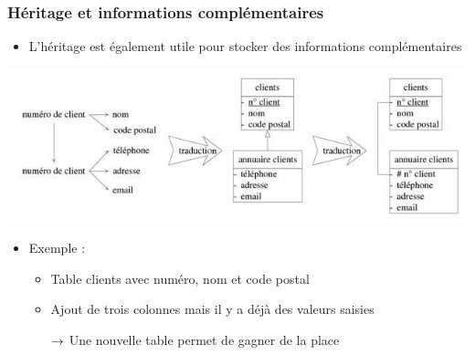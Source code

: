 \begin{frame}
  \frametitle{Héritage et informations complémentaires}
  \begin{itemize}
    \item L'héritage est également utile pour stocker des informations complémentaires
  \end{itemize}
  \begin{center}
    \includegraphics[width=0.9\linewidth]{heritage_informations_complementaires.jpg}
  \end{center}
  \begin{itemize}
    \item Exemple :
      \begin{itemize}
        \item Table clients avec numéro, nom et code postal
        \item Ajout de trois colonnes mais il y a déjà des valeurs saisies
        \item[$\rightarrow$] Une nouvelle table permet de gagner de la place
      \end{itemize}
  \end{itemize}
\end{frame}
